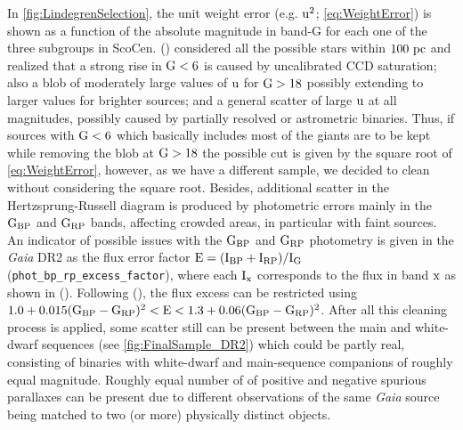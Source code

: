 In \autoref{fig:LindegrenSelection}, the unit weight error (e.g. $\textnormal{u}^2$; \autoref{eq:WeightError}) is shown as a function of the absolute magnitude in band-G for each one of the three subgroups in ScoCen.  (\citeyear{2018arXiv180409366L}) considered all the possible stars within $100~\textnormal{pc}$ and realized that a strong rise in $\textnormal{G} < 6$ is caused by uncalibrated CCD saturation; also a blob of moderately large values of $\textnormal{u}$ for $\textnormal{G} > 18$ possibly extending to larger values for brighter sources; and a general scatter of large $\textnormal{u}$ at all magnitudes, possibly caused by partially resolved or astrometric binaries. Thus, if sources with $\textnormal{G} < 6$ which basically includes most of the giants are to be kept while removing the blob at $\textnormal{G} > 18$ the possible cut is given by the square root of \autoref{eq:WeightError}, however, as we have a different sample, we decided to clean without considering the square root. Besides, additional scatter in the Hertzsprung-Russell diagram is produced by photometric errors mainly in the $\textnormal{G}_\textnormal{BP}$ and $\textnormal{G}_\textnormal{RP}$ bands, affecting crowded areas, in particular with faint sources. An indicator of possible issues with the $\textnormal{G}_\textnormal{BP}$ and $\textnormal{G}_\textnormal{RP}$ photometry is given in the \textit{Gaia} DR2 as the flux error factor $\textnormal{E} = (\textnormal{I}_\textnormal{BP} + \textnormal{I}_\textnormal{RP}) / \textnormal{I}_\textnormal{G}$ (\texttt{phot\_bp\_rp\_excess\_factor}), where each $\textnormal{I}_\textnormal{x}$ corresponds to the flux in band $\textnormal{x}$ as shown in  (\citeyear{2017A&A...600A..51E}). Following  (\citeyear{2018arXiv180409366L}), the flux excess can be restricted using $1.0 + 0.015(\textnormal{G}_\textnormal{BP}-\textnormal{G}_\textnormal{RP})^2 < \textnormal{E} < 1.3 + 0.06(\textnormal{G}_\textnormal{BP}-\textnormal{G}_\textnormal{RP})^2$. After all this cleaning process is applied, some scatter still can be present between the main and white-dwarf sequences (see \autoref{fig:FinalSample_DR2}) which could be partly real, consisting of binaries with white-dwarf and main-sequence companions of roughly equal magnitude. Roughly equal number of of positive and negative spurious parallaxes can be present due to different observations of the same \textit{Gaia} source being matched to two (or more) physically distinct objects.

